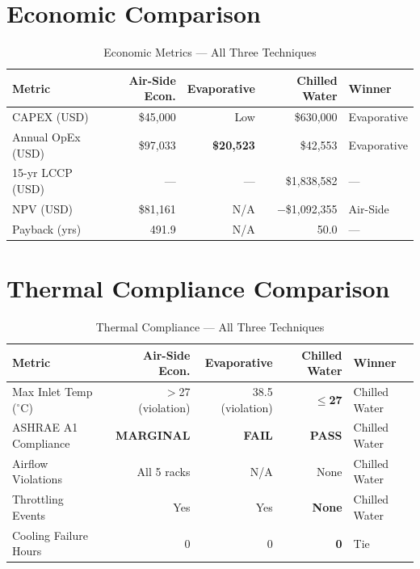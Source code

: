 \documentclass[12pt,a4paper]{report}
\newcommand{\pass}{\textcolor{passgreen}{\textbf{PASS}}}
\newcommand{\fail}{\textcolor{failred}{\textbf{FAIL}}}
\newcommand{\marginal}{\textcolor{warnorng}{\textbf{MARGINAL}}}
\newcommand{\degC}{$^{\circ}$C}
\begin{document}
\section{Economic Comparison}

\begin{table}[H]
\centering
\caption{Economic Metrics --- All Three Techniques}
\label{tab:compare_econ}
\renewcommand{\arraystretch}{1.4}
\begin{tabular}{lrrrl}
\toprule
\textbf{Metric} & \textbf{Air-Side Econ.} & \textbf{Evaporative} & \textbf{Chilled Water} & \textbf{Winner} \\
\midrule
CAPEX (USD) & \$45{,}000 & Low & \$630{,}000 & Evaporative \\
Annual OpEx (USD) & \$97{,}033 & \textbf{\$20{,}523} & \$42{,}553 & Evaporative \\
15-yr LCCP (USD) & --- & --- & \$1{,}838{,}582 & --- \\
NPV (USD) & \$81{,}161 & N/A & $-$\$1{,}092{,}355 & Air-Side \\
Payback (yrs) & 491.9 & N/A & 50.0 & --- \\
\bottomrule
\end{tabular}
\end{table}

\section{Thermal Compliance Comparison}

\begin{table}[H]
\centering
\caption{Thermal Compliance --- All Three Techniques}
\label{tab:compare_thermal}
\renewcommand{\arraystretch}{1.4}
\begin{tabular}{lrrrl}
\toprule
\textbf{Metric} & \textbf{Air-Side Econ.} & \textbf{Evaporative} & \textbf{Chilled Water} & \textbf{Winner} \\
\midrule
Max Inlet Temp (\degC) & $>$27 (violation) & 38.5 (violation) & \textbf{$\leq$27} & Chilled Water \\
ASHRAE A1 Compliance & \marginal & \fail & \pass & Chilled Water \\
Airflow Violations & All 5 racks & N/A & None & Chilled Water \\
Throttling Events & Yes & Yes & \textbf{None} & Chilled Water \\
Cooling Failure Hours & 0 & 0 & \textbf{0} & Tie \\
\bottomrule
\end{tabular}
\end{table}
\end{document}
